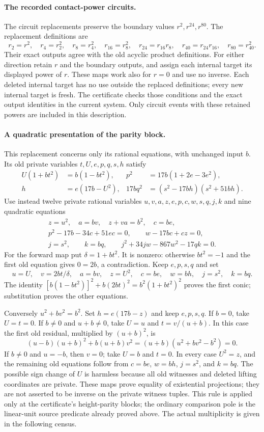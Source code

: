 \documentclass[11pt]{article}
\theoremstyle{definition}
\theoremstyle{remark}
\begin{document}
\paragraph{The recorded contact-power circuits.}
The circuit replacements preserve the boundary values $r^2,r^{24},r^{80}$.
The replacement definitions are
\[
 r_2=r^2,\quad r_4=r_2^2,\quad r_8=r_4^2,\quad
 r_{16}=r_8^2,\quad r_{24}=r_{16}r_8,\quad
 r_{40}=r_{24}r_{16},\quad r_{80}=r_{40}^2.
\]
Their exact outputs agree with the old acyclic product definitions.
For either direction retain $r$ and the boundary outputs, and assign
each internal target its displayed power of $r$. These maps work also
for $r=0$ and use no inverse. Each deleted internal target has no use
outside the replaced definitions; every new internal target is fresh.
The certificate checks those conditions and the exact output identities
in the current system. Only circuit events with these retained powers
are included in this description.

\paragraph{A quadratic presentation of the parity block.}
This replacement concerns only its rational equations, with unchanged
input $b$. Its old private variables $t,U,e,p,q,s,h$ satisfy
\begin{align*}
 U(1+bt^2)&=b(1-bt^2),&
 p^2&=17b(1+2e-3e^2),\\
 h&=e(17b-U^2),&
 17bq^2&=(s^2-17bh)(s^2+51bh).
\end{align*}
Use instead twelve private rational variables
$u,v,a,z,e,p,c,w,s,q,j,k$ and nine quadratic equations
\begin{gather*}
 z=u^2,\quad a=bv,\quad z+va=b^2,\quad c=be,\\
 p^2-17b-34c+51ec=0,\qquad w-17bc+cz=0,\\
 j=s^2,\qquad k=bq,\qquad
 j^2+34jw-867w^2-17qk=0.
\end{gather*}
For the forward map put $\delta=1+bt^2$. It is nonzero: otherwise
$bt^2=-1$ and the first old equation gives $0=2b$, a contradiction.
Keep $e,p,s,q$ and set
\[
 u=U,\quad v=2bt/\delta,\quad a=bv,\quad z=U^2,\quad
 c=be,\quad w=bh,\quad j=s^2,\quad k=bq.
\]
The identity
$[b(1-bt^2)]^2+b(2bt)^2=b^2(1+bt^2)^2$ proves the first conic;
substitution proves the other equations.

Conversely $u^2+bv^2=b^2$. Set $h=e(17b-z)$ and keep $e,p,s,q$.
If $b=0$, take $U=t=0$. If $b\ne0$ and $u+b\ne0$, take
$U=u$ and $t=v/(u+b)$. In this case the first old residual, multiplied
by $(u+b)^2$, is
\[
 (u-b)(u+b)^2+b(u+b)v^2
       =(u+b)(u^2+bv^2-b^2)=0.
\]
If $b\ne0$ and $u=-b$, then $v=0$; take $U=b$ and $t=0$.
In every case $U^2=z$, and the remaining old equations follow from
$c=be$, $w=bh$, $j=s^2$, and $k=bq$. The possible sign change of $U$
is harmless because all old witnesses and deleted lifting coordinates
are private. These maps prove equality of existential projections;
they are not asserted to be inverse on the private witness tuples.
This rule is applied only at the certificate's height-parity blocks;
the ordinary comparison pole is the linear-unit source predicate already
proved above. The actual multiplicity is given in the following census.
\end{document}

